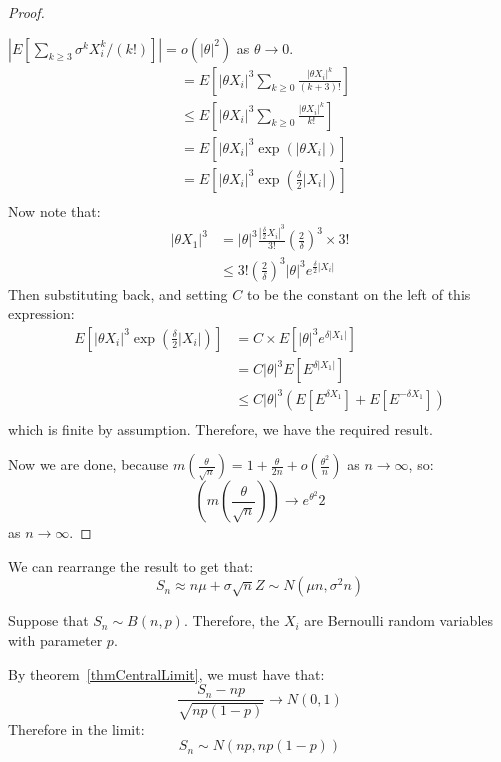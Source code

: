 \documentclass[../Main.tex]{subfiles}
\begin{document}
\begin{proof}
\begin{subproof}{$\left|E\left[\sum_{k \geq 3} \sigma^k X_i^k / (k!)\right]\right| = o(|\theta|^2)$ as $\theta \to 0$.}
\begin{align*}
            &= E\left[|\theta X_i|^3 \sum_{k \geq 0} \frac{|\theta X_i|^k}{(k + 3)!}\right] \\
            &\leq E\left[|\theta X_i|^3 \sum_{k \geq 0} \frac{|\theta X_i|^k}{k!}\right] \\
            &= E\left[|\theta X_i|^3 \exp\left(|\theta X_i|\right)\right] \\
            &= E\left[|\theta X_i|^3 \exp\left(\frac{\delta}{2}|X_i|\right)\right] \\
        \end{align*}
        Now note that:
        \begin{align*}
            |\theta X_1|^3 &= |\theta|^3 \frac{|\frac{\delta}{2} X_i|^3}{3!} \left(\frac{2}{\delta}\right)^3 \times 3! \\
            &\leq 3! \left(\frac{2}{\delta}\right)^3 |\theta|^3 e^{\frac{\delta}{2}|X_i|}
        \end{align*}
        Then substituting back, and setting $C$ to be the constant on the left of this expression:
        \begin{align*}
            E\left[|\theta X_i|^3 \exp\left(\frac{\delta}{2}|X_i|\right)\right] &= C\times E\left[|\theta|^3 e^{\delta |X_1|}\right] \\
            &= C |\theta|^3 E[E^{\delta |X_1|}] \\
            &\leq C |\theta|^3 \left(E[E^{\delta X_1}] + E[E^{-\delta X_1}]\right) \\
        \end{align*}
        which is finite by assumption. Therefore, we have the required result.
    \end{subproof}
    Now we are done, because $m\left(\frac{\theta}{\sqrt{n}}\right) = 1 + \frac{\theta}{2n} + o\left(\frac{\theta^2}{n}\right)$ as $n \to \infty$, so:
    \begin{equation*}
        \left(m\left(\frac{\theta}{\sqrt{n}}\right)\right) \to e^{\theta^2}{2}
    \end{equation*}
    as $n \to \infty$.
\end{proof}
\begin{remark}
    We can rearrange the result to get that:
    \begin{equation*}
        S_n \approx n\mu + \sigma \sqrt{n} Z \sim N(\mu n, \sigma^2 n)
    \end{equation*}
\end{remark}
\begin{example}
    Suppose that $S_n \sim B(n, p)$. Therefore, the $X_i$ are Bernoulli random variables with parameter $p$.

    By theorem~\ref{thmCentralLimit}, we must have that:
    \begin{equation*}
        \frac{S_n - np}{\sqrt{np(1-p)}} \to N(0, 1)
    \end{equation*}
    Therefore in the limit:
    \begin{equation*}
        S_n \sim N(np, np(1-p))
    \end{equation*}
\end{example}
\end{document}

